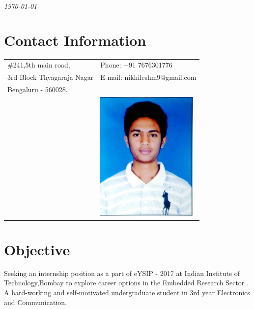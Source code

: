 \documentclass[margin,line]{res}
\begin{document}
 \hfill {\em \today}

\begin{resume}
\section{\sc Contact Information}

\vspace{.05in}
\begin{tabular}{@{}p{3.5in}p{3in}}
\#241,5th main road,             & {Phone:}  +91 7676301776 \\
3rd Block Thyagaraja Nagar 
 & {E-mail:}  nikhileshm9@gmail.com\\
Bengaluru - 560028.\\
 & \includegraphics[width=5cm]{PassportPhoto}
\end{tabular}
\section{\sc Objective}

Seeking an internship position as a part of eYSIP - 2017 at Indian Institute of Technology,Bombay to explore career options in the Embedded Research Sector . A hard-working and self-motivated undergraduate student in 3rd year Electronics and Communication.

\end{resume}
\end{document}

